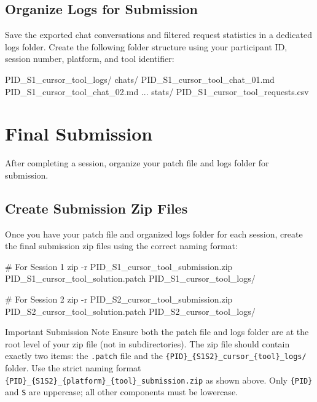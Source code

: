 \documentclass[11pt, a4paper]{article}
\begin{document}
\newpage

\subsection{Organize Logs for Submission}

Save the exported chat conversations and filtered request statistics in a dedicated logs folder. Create the following folder structure using your participant ID, session number, platform, and tool identifier:

\begin{codebox}
{PID}_S1_cursor_{tool}_logs/
    chats/
        {PID}_S1_cursor_{tool}_chat_01.md
        {PID}_S1_cursor_{tool}_chat_02.md
        ...
    stats/
        {PID}_S1_cursor_{tool}_requests.csv
\end{codebox}

\section{Final Submission}

After completing a session, organize your patch file and logs folder for submission.

\subsection{Create Submission Zip Files}

Once you have your patch file and organized logs folder for each session, create the final submission zip files using the correct naming format:
\begin{codebox}
# For Session 1
zip -r {PID}_S1_cursor_{tool}_submission.zip {PID}_S1_cursor_{tool}_solution.patch {PID}_S1_cursor_{tool}_logs/

# For Session 2
zip -r {PID}_S2_cursor_{tool}_submission.zip {PID}_S2_cursor_{tool}_solution.patch {PID}_S2_cursor_{tool}_logs/
\end{codebox}

\begin{mainbox}{Important Submission Note}
Ensure both the patch file and logs folder are at the root level of your zip file (not in subdirectories). The zip file should contain exactly two items: the \texttt{.patch} file and the \texttt{\{PID\}\_\{S1\textbar{}S2\}\_cursor\_\{tool\}\_logs/} folder. Use the strict naming format \texttt{\{PID\}\_\{S1\textbar{}S2\}\_\{platform\}\_\{tool\}\_submission.zip} as shown above. Only \texttt{\{PID\}} and \texttt{S} are uppercase; all other components must be lowercase.
\end{mainbox}
\end{document}
